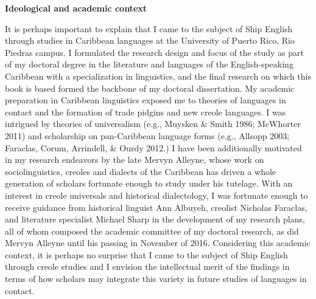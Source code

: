 \setcounter{listWWNumxvleveli}{0}
\begin{listWWNumxvleveli}
\item 

\setcounter{listWWNumxvlevelii}{1}
\begin{listWWNumxvlevelii}
\item 

\setcounter{listWWNumxvleveliii}{1}
\begin{listWWNumxvleveliii}
\item 
\begin{styleNormali}
\textbf{Ideological and academic context}
\end{styleNormali}
\end{listWWNumxvleveliii}
\end{listWWNumxvlevelii}
\end{listWWNumxvleveli}
\begin{styleNormali}
It is perhaps important to explain that I came to the subject of Ship English through studies in Caribbean languages at the University of Puerto Rico, Rio Piedras campus. I formulated the research design and focus of the study as part of my doctoral degree in the literature and languages of the English-speaking Caribbean with a specialization in linguistics, and the final research on which this book is based formed the backbone of my doctoral dissertation. My academic preparation in Caribbean linguistics exposed me to theories of languages in contact and the formation of trade pidgins and new creole languages. I was intrigued by theories of universalism (e.g., Muysken \& Smith 1986; McWhorter 2011) and scholarship on pan-Caribbean language forms (e.g., Allsopp 2003; Faraclas, Corum, Arrindell, \& Ourdy 2012.) I have been additionally motivated in my research endeavors by the late Mervyn Alleyne, whose work on sociolinguistics, creoles and dialects of the Caribbean has driven a whole generation of scholars fortunate enough to study under his tutelage. With an interest in creole universals and historical dialectology, I was fortunate enough to receive guidance from historical linguist Ann Albuyeh, creolist Nicholas Faraclas, and literature specialist Michael Sharp in the development of my research plans, all of whom composed the academic committee of my doctoral research, as did Mervyn Alleyne until his passing in November of 2016. Considering this academic context, it is perhaps no surprise that I came to the subject of Ship English through creole studies and I envision the intellectual merit of the findings in terms of how scholars may integrate this variety in future studies of languages in contact.
\end{styleNormali}

